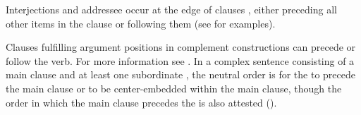 Interjections and addressee  occur at the edge of clauses , either preceding all other items in the clause or following them (see  for examples).

Clauses fulfilling argument positions in complement constructions can precede or follow the verb. For more information see . In a complex sentence consisting of a main clause and at least one subordinate , the neutral order is for the  to precede the main clause or to be center-embedded within the main clause, though the order in which the main clause precedes the  is also attested ().

